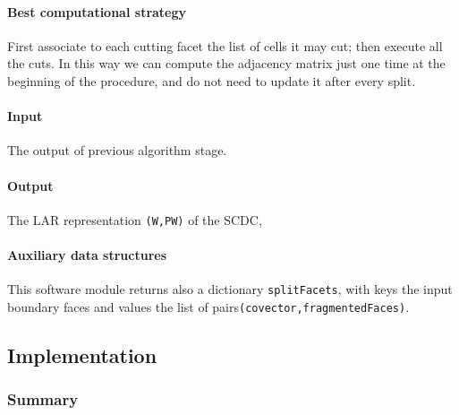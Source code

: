 \documentclass[11pt,oneside]{article}	%
\begin{document}
\paragraph{Best computational strategy}
First associate to each cutting facet the list of cells it may cut; then execute all the cuts. In this way we can compute the adjacency matrix just one time at the beginning of the procedure, and do not need to update it after every split.

\paragraph{Input}
The output of previous algorithm stage.

\paragraph{Output}
The LAR representation \texttt{(W,PW)} of the SCDC,

\paragraph{Auxiliary data structures} 
This software module returns also
 a dictionary \texttt{splitFacets}, with keys the  input boundary faces and values the list of pairs\texttt{(covector,fragmentedFaces)}.   


\subsection{Implementation}

\subsubsection{Summary}
\end{document}

